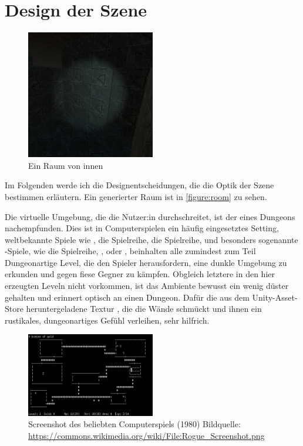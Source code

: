 \section{Design der Szene} \label{sec:scene-design}

\begin{figure}[!h]
    \centering
    \includegraphics[width=0.5\textwidth]{vrscreenshots/rauminnen.jpg}
    \caption{Ein Raum von innen}\label{figure:room}
\end{figure}

Im Folgenden werde ich die Designentscheidungen, die die Optik der Szene bestimmen erläutern.
Ein generierter Raum ist in \autoref{figure:room} zu sehen.

Die virtuelle Umgebung, die die Nutzer:in durchschreitet, ist der eines Dungeons nachempfunden. Dies ist in Computerspielen ein häufig eingesetztes Setting, weltbekannte Spiele wie
, %
die  Spielreihe,
die  Spielreihe,
und besonders sogenannte -Spiele, wie
die  Spielreihe,
,
oder , beinhalten alle zumindest zum Teil Dungeonartige Level, die den Spieler herausfordern, eine dunkle Umgebung zu erkunden und gegen fiese Gegner zu kämpfen.
Obgleich letztere in den hier erzeugten Leveln nicht vorkommen, ist das  Ambiente bewusst ein wenig düster gehalten und erinnert optisch an einen Dungeon. Dafür die aus dem Unity-Asset-Store heruntergeladene Textur \cite{dungeon-material}, die die Wände schmückt und ihnen ein rustikales, dungeonartiges Gefühl verleihen, sehr hilfrich.

\begin{figure}[!h]
    \centering
    \includegraphics[width=0.5\textwidth]{images/rogue.png}
    \caption{
        Screenshot des beliebten Computerspiels  (1980)
        Bildquelle: \href{https://commons.wikimedia.org/wiki/File:Rogue_Screenshot.png}{https://commons.wikimedia.org/wiki/File:Rogue\_Screenshot.png}
    }
    \label{figure:rogue}
\end{figure}

